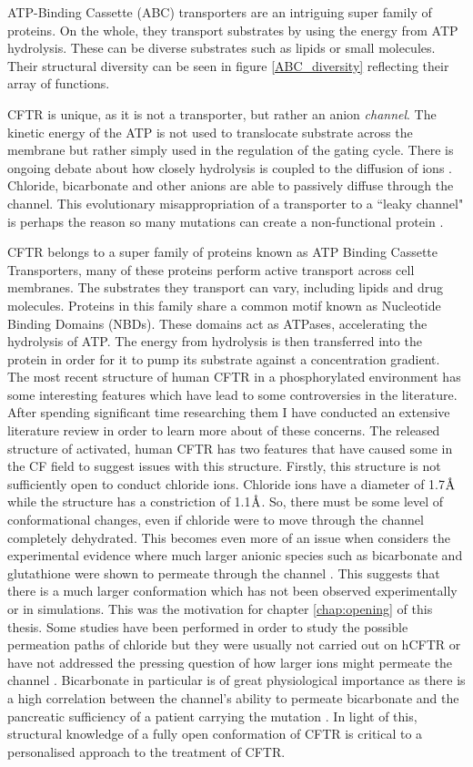 ATP-Binding Cassette (ABC) transporters are an intriguing super family of proteins. On the whole, they transport substrates by using the energy from ATP hydrolysis. These can be diverse substrates such as lipids or small molecules. Their structural diversity can be seen in figure \ref{ABC_diversity} reflecting their array of functions. 

CFTR is unique, as it is not a transporter, but rather an anion \textit{channel}. The kinetic energy of the ATP is not used to translocate substrate across the membrane but rather simply used in the regulation of the gating cycle. There is ongoing debate about how closely hydrolysis is coupled to the diffusion of ions \cite{}. Chloride, bicarbonate and other anions are able to passively diffuse through the channel. This evolutionary misappropriation of a transporter to a ``leaky channel" is perhaps the reason so many mutations can create a non-functional protein \cite{depristo2005,linsdell2018}.

CFTR belongs to a super family of proteins known as ATP Binding Cassette Transporters,  many of these proteins perform active transport across cell membranes. The substrates they transport can vary, including lipids and drug molecules. Proteins in this family share a common motif known as Nucleotide Binding Domains (NBDs). These domains act as ATPases, accelerating the hydrolysis of ATP. The energy from hydrolysis is then transferred into the protein in order for it to pump its substrate against a concentration gradient. 
The most recent structure of human CFTR in a phosphorylated environment has some interesting features which have lead to some controversies in the literature. After spending significant time researching them I have conducted an extensive literature review in order to learn more about of these concerns. The released structure of activated, human CFTR has two features that have caused some in the CF field to suggest issues with this structure. Firstly, this structure is not sufficiently open to conduct chloride ions. Chloride ions have a diameter of 1.7$\textup{\AA}$ while the structure has a constriction of 1.1$\textup{\AA}$\cite{zhang2018}. So, there must be some level of conformational changes, even if chloride were to move through the channel completely dehydrated. This becomes even more of an issue when considers the experimental evidence where much larger anionic species such as bicarbonate and glutathione were shown to permeate through the channel \cite{kogan2003}. This suggests that there is a much larger conformation which has not been observed experimentally or in simulations. This was the motivation for chapter \ref{chap:opening} of this thesis. Some studies have been performed in order to study the possible permeation paths of chloride but they were usually not carried out on hCFTR or have not addressed the pressing question of how larger ions might permeate the channel \cite{farkas2020, zeng2021}. Bicarbonate in particular is of great physiological importance as there is a high correlation between the channel's ability to permeate bicarbonate and the pancreatic sufficiency of a patient carrying the mutation \cite{}. In light of this, structural knowledge of a fully open conformation of CFTR is critical to a personalised approach to the treatment of CFTR.

